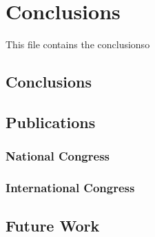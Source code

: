 \chapter{Conclusions}
\label{chap:conclusions}
This file contains the conclusionso

\section{Conclusions}

\section{Publications}

\subsection{National Congress}

\subsection{International Congress}


\section{Future Work}

